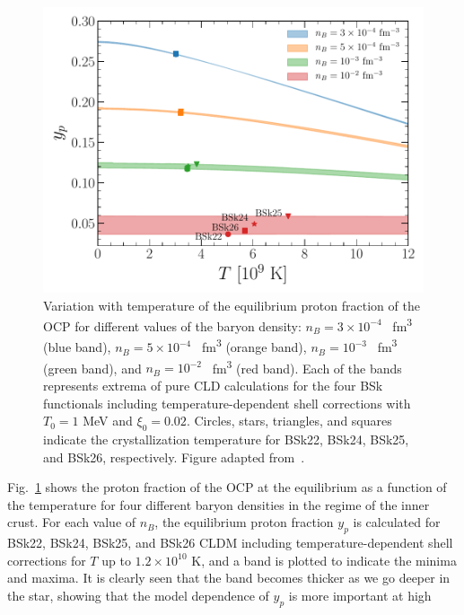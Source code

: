 \begin{figure}[!t]
  \begin{center}
    \includegraphics[width=0.9\linewidth]{figures/ypcell_ocp.pdf}
  \end{center}
  \caption[Equilibrium proton fraction of the one-component plasma versus
  temperature in the inner-crust regime]{Variation with temperature of the 
    equilibrium proton fraction of the OCP 
    for different values of the baryon density: $n_B = 3\times 10^{-4}$ 
    \si{\per \cubic\femto\meter} (blue band), $n_B = 5\times 10^{-4}$ 
    \si{\per \cubic\femto\meter} (orange band), $n_B = 10^{-3}$ 
    \si{\per \cubic\femto\meter} (green band), and $n_B = 10^{-2}$ 
    \si{\per \cubic\femto\meter} (red band). Each of the bands 
    represents extrema of pure CLD calculations for the four BSk functionals 
    including temperature-dependent shell corrections with $T_0 = 1$ \si{\MeV} 
    and $\xi_0 = 0.02$. Circles, stars, triangles, and squares indicate the 
    crystallization temperature for BSk22, BSk24, BSk25, and BSk26, 
    respectively. 
  Figure adapted from~\cite{Carreau2019}.}\label{fig:ypcell_ocp}
\end{figure}
%
Fig.~\ref{fig:ypcell_ocp} shows the proton fraction of the OCP at the 
equilibrium as a function of the temperature for four different baryon 
densities in the regime of the inner crust. 
For each value of $n_B$, the equilibrium proton fraction $y_p$ is calculated 
for BSk22, BSk24, BSk25, and BSk26 CLDM including temperature-dependent shell
corrections for $T$ up to $1.2\times 10^{10}$ K,
and a band is plotted to indicate the minima and maxima.
%
It is clearly seen that the band becomes thicker as we go deeper in the
star, showing that the model dependence of $y_p$ is more important at high 
